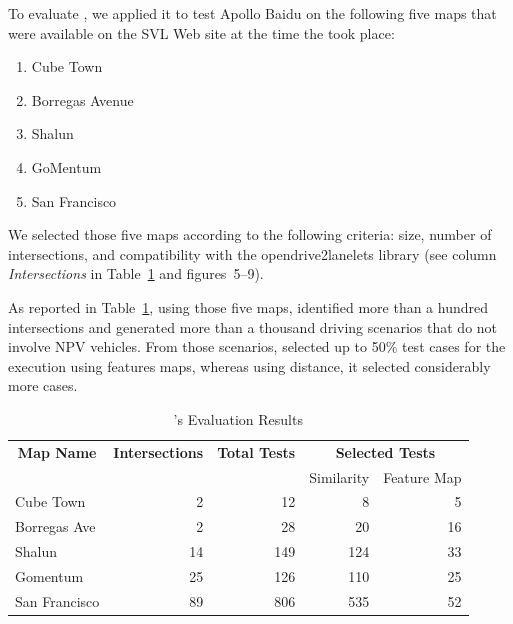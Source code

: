 \documentclass[conference]{IEEEtran}
\begin{document}
To evaluate \tool, we applied it to test Apollo Baidu on the following five maps that were available on the SVL Web site at the time the \challenge took place:

\begin{enumerate}
 \item Cube Town
 \item Borregas Avenue
 \item Shalun
 \item GoMentum
 \item San Francisco
\end{enumerate}

We selected those five maps according to the following criteria: size, number of intersections, and compatibility with the opendrive2lanelets library (see column \emph{Intersections} in Table~\ref{tab:results} and figures~5--9).

As reported in Table~\ref{tab:results}, using those five maps, \tool identified more than a hundred intersections and generated more than a thousand driving scenarios that do not involve NPV vehicles. From those scenarios, \tool selected up to 50\% test cases for the execution using features maps, whereas using distance, it selected considerably more cases.

\begin{table}[t]
    \centering
      \caption{\tool's Evaluation Results}
      \label{tab:results}
      \begin{tabular}{lrrrr}
        \toprule
        \multicolumn{1}{c}{\textbf{Map Name}}&
        \multicolumn{1}{c}{\textbf{Intersections}}&
        \multicolumn{1}{c}{\textbf{Total Tests}}&
        \multicolumn{2}{c}{\textbf{Selected Tests}} \\
        & & & Similarity & Feature Map\\
        \midrule
        Cube Town & 2 & 12 & 8 & 5\\
        Borregas Ave & 2 & 28 & 20 & 16\\
        Shalun & 14 & 149 & 124 & 33\\
        Gomentum & 25 & 126 & 110 & 25\\
        San Francisco & 89 & 806 & 535 & 52\\
        \bottomrule
      \end{tabular}
\end{table}
\end{document}
